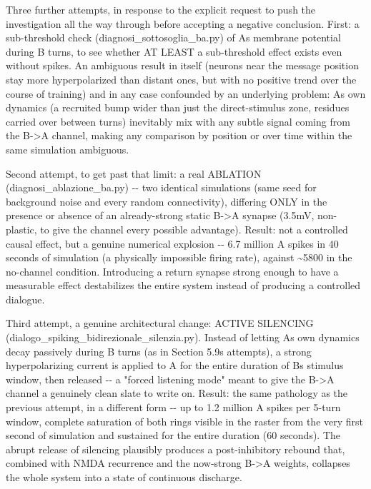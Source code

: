 \documentclass[
  english,
]{article}
\begin{document}
Three further attempts, in response to the explicit request to push the investigation all the way through before accepting a negative conclusion. First: a sub-threshold check (diagnosi\_\allowbreak{}sottosoglia\_\allowbreak{}ba.py) of A\textquotesingle s membrane potential during B turns, to see whether AT LEAST a sub-threshold effect exists even without spikes. An ambiguous result in itself (neurons near the message position stay more hyperpolarized than distant ones, but with no positive trend over the course of training) and in any case confounded by an underlying problem: A\textquotesingle s own dynamics (a recruited bump wider than just the direct-stimulus zone, residues carried over between turns) inevitably mix with any subtle signal coming from the B-\textgreater A channel, making any comparison by position or over time within the same simulation ambiguous.

Second attempt, to get past that limit: a real ABLATION (diagnosi\_\allowbreak{}ablazione\_\allowbreak{}ba.py) -\/- two identical simulations (same seed for background noise and every random connectivity), differing ONLY in the presence or absence of an already-strong static B-\textgreater A synapse (3.5mV, non-plastic, to give the channel every possible advantage). Result: not a controlled causal effect, but a genuine numerical explosion -\/- 6.7 million A spikes in 40 seconds of simulation (a physically impossible firing rate), against \textasciitilde5800 in the no-channel condition. Introducing a return synapse strong enough to have a measurable effect destabilizes the entire system instead of producing a controlled dialogue.

Third attempt, a genuine architectural change: ACTIVE SILENCING (dialogo\_\allowbreak{}spiking\_\allowbreak{}bidirezionale\_\allowbreak{}silenzia.py). Instead of letting A\textquotesingle s own dynamics decay passively during \textquotesingle B\textquotesingle{} turns (as in Section 5.9\textquotesingle s attempts), a strong hyperpolarizing current is applied to A for the entire duration of B\textquotesingle s stimulus window, then released -\/- a "forced listening mode" meant to give the B-\textgreater A channel a genuinely clean slate to write on. Result: the same pathology as the previous attempt, in a different form -\/- up to 1.2 million A spikes per 5-turn window, complete saturation of both rings visible in the raster from the very first second of simulation and sustained for the entire duration (60 seconds). The abrupt release of silencing plausibly produces a post-inhibitory rebound that, combined with NMDA recurrence and the now-strong B-\textgreater A weights, collapses the whole system into a state of continuous discharge.
\end{document}
